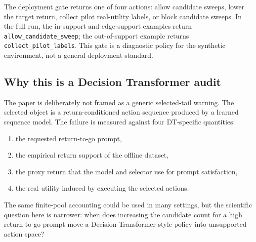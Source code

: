 The deployment gate returns one of four actions: allow candidate sweeps, lower the target return, collect pilot real-utility labels, or block candidate sweeps. In the full run, the in-support and edge-support examples return \texttt{allow\_candidate\_sweep}; the out-of-support example returns \texttt{collect\_pilot\_labels}. This gate is a diagnostic policy for the synthetic environment, not a general deployment standard.

\subsection{Why this is a Decision Transformer audit}

The paper is deliberately not framed as a generic selected-tail warning. The selected object is a return-conditioned action sequence produced by a learned sequence model. The failure is measured against four DT-specific quantities:
\begin{enumerate}
  \item the requested return-to-go prompt,
  \item the empirical return support of the offline dataset,
  \item the proxy return that the model and selector use for prompt satisfaction,
  \item the real utility induced by executing the selected actions.
\end{enumerate}
The same finite-pool accounting could be used in many settings, but the scientific question here is narrower: when does increasing the candidate count for a high return-to-go prompt move a Decision-Transformer-style policy into unsupported action space?

